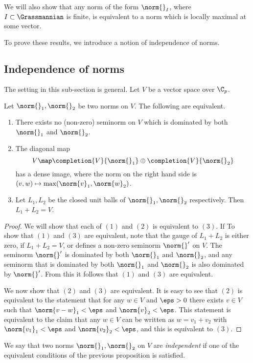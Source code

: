 We will also show that any norm of the form $\norm{}_I$, where $I\subset\Grassmannian$ is finite, is equivalent to a norm which is locally maximal at some vector.

To prove these results, we introduce a  notion of independence of norms.
\subsection{Independence of norms}
The setting in this sub-section is general.
Let $V$ be a vector space over $\C_p$.
\begin{prop}\label{Prop_independence_two_norms}
Let $\norm{}_1,\norm{}_2$ be two norms on $V$.
The following are equivalent.
    \begin{enumerate}
    \item There exists no (non-zero) seminorm on $V$ which is dominated by both $\norm{}_1$ and $\norm{}_2$.
    \item The diagonal map
    \[V\map \completion{V}{\norm{}_1}\oplus\completion{V}{\norm{}_2}\]
    has a dense image, where the norm on the right hand side is $(v,w)\mapsto \max(\norm{v}_1,\norm{w}_2)$.
    \item Let $L_1,L_2$ be the closed unit balls of $\norm{}_1,\norm{}_2$ respectively.
    Then $L_1+L_2=V$.
    \end{enumerate}
\end{prop} 
\begin{proof}
We will show that each of $(1)$ and $(2)$ is equivalent to $(3)$.
If 
To show that $(1)$ and $(3)$ are equivalent, note that the gauge of $L_1+L_2$ is either zero, if $L_1+L_2=V$, or defines a non-zero seminorm $\norm{}'$ on $V$.
The seminorm $\norm{}'$ is dominated by both $\norm{}_1$ and $\norm{}_2$, and any seminorm that is dominated by both $\norm{}_1$ and $\norm{}_2$ is also dominated by $\norm{}'$.
From this it follows that $(1)$ and $(3)$ are equivalent.

We now show that $(2)$ and $(3)$ are equivalent.
It is easy to see that $(2)$ is equivalent to the statement that for any $w\in V$ and $\eps>0$ there exists $v\in V$ such that $\norm{v-w}_1<\eps$ and $\norm{v}_2<\eps$.
This statement is equivalent to the claim that any $w\in V$ can be written as $w=v_1+v_2$ with $\norm{v_1}_1<\eps$ and $\norm{v_2}_2<\eps$, and this is equivalent to $(3)$.
\end{proof} 

\begin{defn}
We say that two norms $\norm{}_1,\norm{}_2$ on $V$ are \textit{independent} if one of the equivalent conditions of the previous proposition is satisfied.
\end{defn} 

